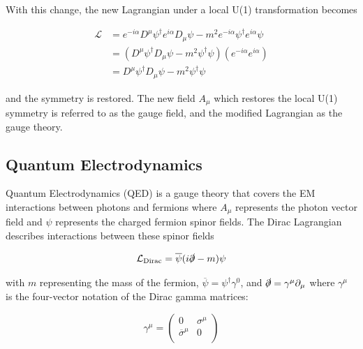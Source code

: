 \documentclass[12pt,a4paper,epsf,portrait,times,epsfig]{report}
\begin{document}
	With this change, the new Lagrangian under a local U(1) transformation becomes

	\begin{equation}
		\begin{split}
			\mathcal{L} &= e^{-i\alpha}D^{\mu}\psi^{\dagger}e^{i\alpha}D_{\mu}\psi - m^{2}e^{-i\alpha}\psi^{\dagger}e^{i\alpha}\psi \\
			&= (D^{\mu}\psi^{\dagger}D_{\mu}\psi - m^{2}\psi^{\dagger}\psi)(e^{-i\alpha}e^{i\alpha}) \\
			&= D^{\mu}\psi^{\dagger}D_{\mu}\psi - m^{2}\psi^{\dagger}\psi
		\end{split}
	\end{equation}


	and the symmetry is restored. The new field $A_{\mu}$ which restores the local U(1) symmetry is referred to as the gauge field, and the modified Lagrangian as the gauge theory. \par



	\subsection{Quantum Electrodynamics} \label{Section:QED}

	Quantum Electrodynamics (QED) is a gauge theory that covers the EM interactions between photons and fermions where $A_{\mu}$ represents the photon vector field and $\psi$ represents the charged fermion spinor fields. The Dirac Lagrangian describes interactions between these spinor fields

	\begin{equation}
		\mathcal{L}_{\mathrm{Dirac}} = \overline{\psi}(i\slashed{\partial}-m)\psi
	\end{equation}

	with $m$ representing the mass of the fermion, $\overline{\psi}=\psi^{\dagger}\gamma^{0}$, and $\slashed{\partial}=\gamma^{\mu}\partial_{\mu}$ where $\gamma^{\mu}$ is the four-vector notation of the Dirac gamma matrices:
	
	\begin{equation}
		\gamma^{\mu}=\begin{pmatrix}
			0 & \sigma^{\mu}  \\
			\overline{\sigma}^{\mu} & 0  \\
		\end{pmatrix}
	\end{equation}
	
\end{document}
